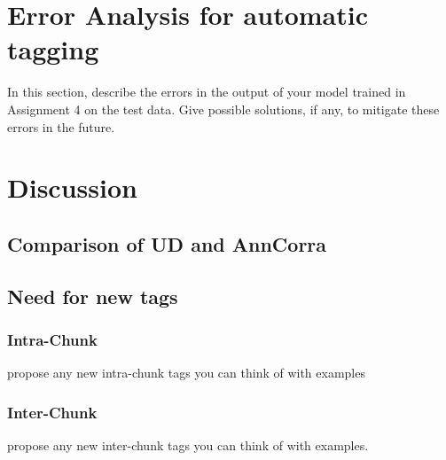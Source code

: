 \documentclass[a4 paper]{article}
\begin{document}
\section{Error Analysis for automatic tagging}
In this section, describe the errors in the output of your model trained in Assignment 4 on the test data. Give possible solutions, if any, to mitigate these errors in the future. 

\section{Discussion}

\subsection{Comparison of UD and AnnCorra}
\subsection{Need for new tags}
\subsubsection{Intra-Chunk}
propose any new intra-chunk tags you can think of with examples
\subsubsection{Inter-Chunk}
propose any new inter-chunk tags you can think of with examples.
\end{document}

